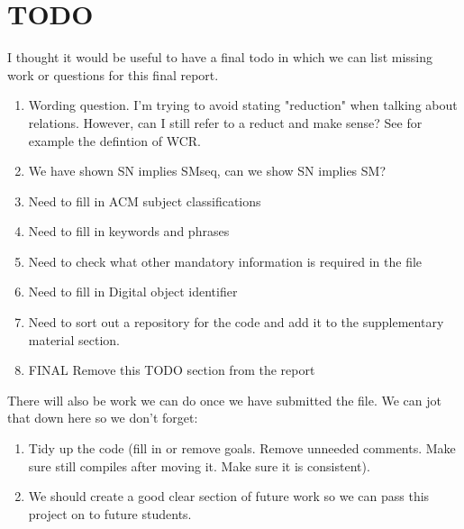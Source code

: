 \section{TODO}

I thought it would be useful to have a final todo in which we can list missing work or questions for this final report.

\begin{enumerate}
    \item Wording question. I'm trying to avoid stating "reduction" when talking about relations. However, can I still refer to a reduct and make sense? See for example the defintion of WCR.
    \item We have shown SN implies SMseq, can we show SN implies SM?
    \item Need to fill in ACM subject classifications
    \item Need to fill in keywords and phrases
    \item Need to check what other mandatory information is required in the file 
    \item Need to fill in Digital object identifier 
    \item Need to sort out a repository for the code and add it to the supplementary material section. 
    \item FINAL Remove this TODO section from the report 
\end{enumerate}

There will also be work we can do once we have submitted the file. We can jot that down here so we don't forget:

\begin{enumerate}
    \item Tidy up the code (fill in or remove goals. Remove unneeded comments. Make sure still compiles after moving it. Make sure it is consistent).
    \item We should create a good clear section of future work so we can pass this project on to future students.
\end{enumerate}